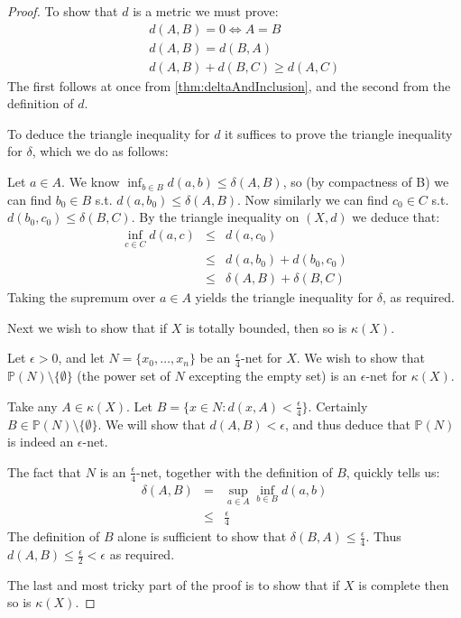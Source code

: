 \documentclass[a4paper,11pt]{article}
\newcommand{\bbP}{\mathbb{P}}
\begin{document}
\begin{proof}
To show that $d$ is a metric we must prove:
\begin{eqnarray*}
&&d(A,B)=0 \iff A=B \\
&&d(A,B)=d(B,A) \\
&&d(A,B)+d(B,C)\geq d(A,C)
\end{eqnarray*}
%
The first follows at once from \ref{thm:deltaAndInclusion}, and the second from
the definition of $d$.

To deduce the triangle inequality for $d$ it suffices to prove the triangle
inequality for $\delta$, which we do as follows:

Let $a\in A$.  We know $\inf_{b\in B}d(a,b)\leq\delta(A,B)$, so (by compactness
of B) we can find $b_0\in B$ s.t.
$d(a,b_0)\leq\delta(A,B)$.  Now similarly we can
find $c_0\in C$ s.t. $d(b_0,c_0)\leq\delta(B,C)$.
By the triangle inequality on
$(X,d)$ we deduce that:
%
\begin{eqnarray*}
\inf_{c\in C}d(a,c)&\leq&d(a,c_0) \\
  &\leq& d(a,b_0)+d(b_0,c_0) \\
  &\leq& \delta(A,B)+\delta(B,C)
\end{eqnarray*}
%
Taking the supremum over $a\in A$ yields the triangle inequality for $\delta$,
as required.

Next we wish to show that if $X$ is totally bounded, then so is $\kappa(X)$.

Let $\epsilon>0$, and let $N=\{x_0,\ldots,x_n\}$ be an $\frac{\epsilon}{4}$-net
for $X$.  We wish to show that
$\bbP(N)\setminus\{\emptyset\}$ (the power set of $N$
excepting the empty set) is an
$\epsilon$-net for $\kappa(X)$.

Take any $A\in\kappa(X)$.  Let $B=\{x\in N:d(x,A)<\frac{\epsilon}{4}\}$.
Certainly $B\in\bbP(N)\setminus\{\emptyset\}$.  We
will show that $d(A,B)<\epsilon$, and thus deduce that $\bbP(N)$ is indeed an
$\epsilon$-net.

The fact that $N$ is an $\frac{\epsilon}{4}$-net, together with the definition
of $B$, quickly tells us:
%
\begin{eqnarray*}
\delta(A,B)
  &=& \sup_{a\in A}\inf_{b\in B}d(a,b) \\
  &\leq& \frac{\epsilon}{4}
\end{eqnarray*}
%
The definition of $B$ alone is sufficient to show that
$\delta(B,A)\leq\frac{\epsilon}{4}$.  Thus
$d(A,B)\leq\frac{\epsilon}{2}<\epsilon$ as required.

The last and most tricky part of the proof is to show that if $X$ is complete
then so is $\kappa(X)$.


\end{proof}
\end{document}
